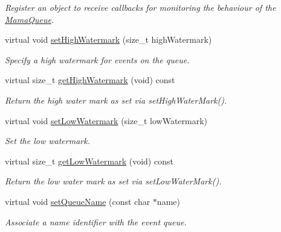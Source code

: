 \begin{DoxyCompactItemize}
\begin{DoxyCompactList}\small\item\em Register an object to receive callbacks for monitoring the behaviour of the \hyperlink{classWombat_1_1MamaQueue}{MamaQueue}. \item\end{DoxyCompactList}\item 
virtual void \hyperlink{classWombat_1_1MamaQueue_ab1c8c7a72c3acd9aac71bc9baebdb6ff}{setHighWatermark} (size\_\-t highWatermark)
\begin{DoxyCompactList}\small\item\em Specify a high watermark for events on the queue. \item\end{DoxyCompactList}\item 
virtual size\_\-t \hyperlink{classWombat_1_1MamaQueue_a367350a4f52003325fbc72031094f3b5}{getHighWatermark} (void) const 
\begin{DoxyCompactList}\small\item\em Return the high water mark as set via {\ttfamily setHighWaterMark()}. \item\end{DoxyCompactList}\item 
virtual void \hyperlink{classWombat_1_1MamaQueue_a186d02095e3e6b65abe0b34603d3ab30}{setLowWatermark} (size\_\-t lowWatermark)
\begin{DoxyCompactList}\small\item\em Set the low watermark. \item\end{DoxyCompactList}\item 
virtual size\_\-t \hyperlink{classWombat_1_1MamaQueue_abbdc2a846667fd60ee520c141ff0e1c0}{getLowWatermark} (void) const 
\begin{DoxyCompactList}\small\item\em Return the low water mark as set via {\ttfamily setLowWaterMark()}. \item\end{DoxyCompactList}\item 
virtual void \hyperlink{classWombat_1_1MamaQueue_ab44bf7f7f43693737d58f0155dbf7cc3}{setQueueName} (const char $\ast$name)
\begin{DoxyCompactList}\small\item\em Associate a name identifier with the event queue. \item\end{DoxyCompactList}\item 

\end{DoxyCompactItemize}
